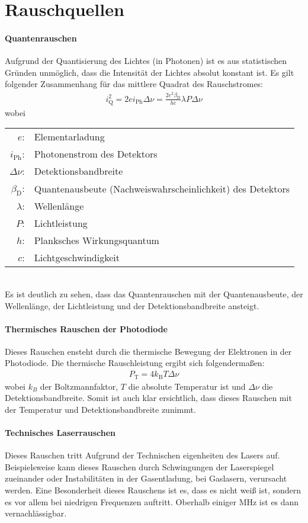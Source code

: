 
\section{Rauschquellen}
\label{sec:rauschen}

\paragraph*{Quantenrauschen}
Aufgrund der Quantisierung des Lichtes (in Photonen) ist es aus statistischen Gründen unmöglich, dass die Intensität der Lichtes absolut konstant ist. Es gilt folgender Zusammenhang für das mittlere Quadrat des Rauschstromes:
\begin{gather}
    i^2_\mathrm{Q} = 2ei_\mathrm{Ph}\Delta \nu = \frac{2e^2\beta_\mathrm{D}}{hc}\lambda P \Delta \nu
\end{gather}
wobei\\
\begin{tabular}{rl}
    $e$: & Elementarladung \\
    $i_\mathrm{Ph}$: & Photonenstrom des Detektors\\
    $\Delta \nu$: & Detektionsbandbreite\\
    $\beta_\mathrm{D}$: & Quantenausbeute (Nachweiswahrscheinlichkeit) des Detektors\\
    $\lambda$: & Wellenlänge\\
    $P$: & Lichtleistung\\
    $h$: & Planksches Wirkungsquantum\\
    $c$: & Lichtgeschwindigkeit
\end{tabular}\\
Es ist deutlich zu sehen, dass das Quantenrauschen mit der Quantenausbeute, der Wellenlänge, der Lichtleistung und der Detektionsbandbreite ansteigt.

\paragraph*{Thermisches Rauschen der Photodiode}
Dieses Rauschen ensteht durch die thermische Bewegung der Elektronen in der Photodiode. Die thermische Rauschleistung ergibt sich folgendermaßen:
\begin{gather}
    P_\mathrm{T} = 4 k_\mathrm{B} T \Delta \nu
\end{gather}
wobei $k_B$ der Boltzmannfaktor, $T$ die absolute Temperatur ist und $\Delta \nu$ die Detektionsbandbreite. Somit ist auch klar ersichtlich, dass dieses Rauschen mit der Temperatur und Detektionsbandbreite zunimmt.


\paragraph*{Technisches Laserrauschen}
Dieses Rauschen tritt Aufgrund der Technischen eigenheiten des Lasers auf. Beispielsweise kann dieses Rauschen durch Schwingungen der Laserspiegel zueinander oder Instabilitäten in der Gasentladung, bei Gaslasern, verursacht werden. Eine Besonderheit dieses Rauschens ist es, dass es nicht weiß ist, sondern es vor allem bei niedrigen Frequenzen auftritt. Oberhalb einiger MHz ist es dann vernachlässigbar. 
